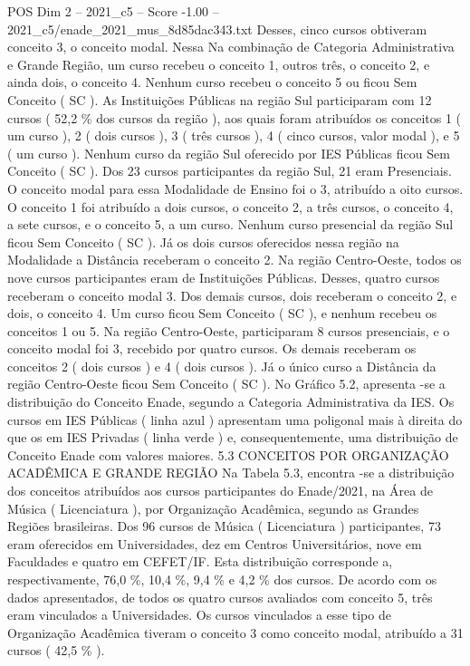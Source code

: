 \begin{textsample}{POS Dim 2 – 2021\_c5 – Score -1.00 – 2021\_c5/enade\_2021\_mus\_8d85dac343.txt}
Desses, cinco cursos obtiveram conceito 3, o conceito modal.
Nessa Na combinação de Categoria Administrativa e Grande Região, um curso recebeu o conceito 1, outros três, o conceito 2, e ainda dois, o conceito 4.
Nenhum curso recebeu o conceito 5 ou ficou Sem Conceito ( SC ).
As Instituições Públicas na região Sul participaram com 12 cursos ( 52,2 \% dos cursos da região ), aos quais foram atribuídos os conceitos 1 ( um curso ), 2 ( dois cursos ), 3 ( três cursos ), 4 ( cinco cursos, valor modal ), e 5 ( um curso ).
Nenhum curso da região Sul oferecido por IES Públicas ficou Sem Conceito ( SC ).
Dos 23 cursos participantes da região Sul, 21 eram Presenciais.
O conceito modal para essa Modalidade de Ensino foi o 3, atribuído a oito cursos.
O conceito 1 foi atribuído a dois cursos, o conceito 2, a três cursos, o conceito 4, a sete cursos, e o conceito 5, a um curso.
Nenhum curso presencial da região Sul ficou Sem Conceito ( SC ).
Já os dois cursos oferecidos nessa região na Modalidade a Distância receberam o conceito 2.
Na região Centro-Oeste, todos os nove cursos participantes eram de Instituições Públicas.
Desses, quatro cursos receberam o conceito modal 3.
Dos demais cursos, dois receberam o conceito 2, e dois, o conceito 4.
Um curso ficou Sem Conceito ( SC ), e nenhum recebeu os conceitos 1 ou 5.
Na região Centro-Oeste, participaram 8 cursos presenciais, e o conceito modal foi 3, recebido por quatro cursos.
Os demais receberam os conceitos 2 ( dois cursos ) e 4 ( dois cursos ).
Já o único curso a Distância da região Centro-Oeste ficou Sem Conceito ( SC ).
No Gráfico 5.2, apresenta -se a distribuição do Conceito Enade, segundo a Categoria Administrativa da IES.
Os cursos em IES Públicas ( linha azul ) apresentam uma poligonal mais à direita do que os em IES Privadas ( linha verde ) e, consequentemente, uma distribuição de Conceito Enade com valores maiores. 5.3 CONCEITOS POR ORGANIZAÇÃO ACADÊMICA E GRANDE REGIÃO Na Tabela 5.3, encontra -se a distribuição dos conceitos atribuídos aos cursos participantes do Enade/2021, na Área de Música ( Licenciatura ), por Organização Acadêmica, segundo as Grandes Regiões brasileiras.
Dos 96 cursos de Música ( Licenciatura ) participantes, 73 eram oferecidos em Universidades, dez em Centros Universitários, nove em Faculdades e quatro em CEFET/IF.
Esta distribuição corresponde a, respectivamente, 76,0 \%, 10,4 \%, 9,4 \% e 4,2 \% dos cursos.
De acordo com os dados apresentados, de todos os quatro cursos avaliados com conceito 5, três eram vinculados a Universidades.
Os cursos vinculados a esse tipo de Organização Acadêmica tiveram o conceito 3 como conceito modal, atribuído a 31 cursos ( 42,5 \% ).

\end{textsample}
